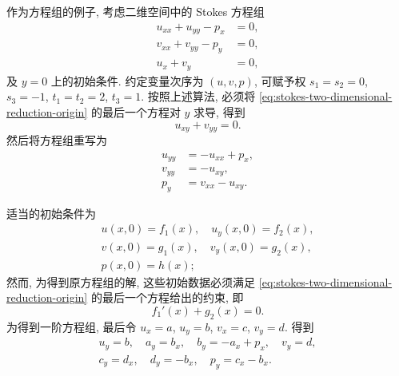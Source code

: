 \begin{Example}\label{ex:stokes-general-reduction}作为方程组的例子, 考虑二维空间中的 Stokes 方程组
\begin{equation}\label{eq:stokes-two-dimensional-reduction-origin}
\begin{aligned}
u_{xx}+u_{yy}-p_x&=0,\\v_{xx}+v_{yy}-p_y&=0,\\u_x+v_y&=0,
\end{aligned}
\end{equation}
及 $y=0$ 上的初始条件. 约定变量次序为 $(u,v,p)$, 可赋予权 $s_1=s_2=0$, $s_3=-1$, $t_1=t_2=2$, $t_3=1$. 按照上述算法, 必须将 \eqref{eq:stokes-two-dimensional-reduction-origin} 的最后一个方程对 $y$ 求导, 得到
\begin{equation}\label{eq:stokes-differentiated-divergence}
u_{xy}+v_{yy}=0.
\end{equation}
然后将方程组重写为
\begin{equation}\label{eq:stokes-normal-solved-system}
\begin{aligned}
u_{yy}&=-u_{xx}+p_x,\\v_{yy}&=-u_{xy},\\p_y&=v_{xx}-u_{xy}.
\end{aligned}
\end{equation}


适当的初始条件为
\begin{equation}\label{eq:stokes-reduction-initial-data}
\begin{gathered}
u(x,0)=f_1(x),\quad u_y(x,0)=f_2(x),\\
v(x,0)=g_1(x),\quad v_y(x,0)=g_2(x),\\
p(x,0)=h(x);
\end{gathered}
\end{equation}
然而, 为得到原方程组的解, 这些初始数据必须满足 \eqref{eq:stokes-two-dimensional-reduction-origin} 的最后一个方程给出的约束, 即
\begin{equation}\label{eq:stokes-reduction-initial-constraint}
f_1'(x)+g_2(x)=0.
\end{equation}
为得到一阶方程组, 最后令 $u_x=a$, $u_y=b$, $v_x=c$, $v_y=d$. 得到
\begin{equation}\label{eq:stokes-first-order-reduction}
\begin{gathered}
u_y=b,\quad a_y=b_x,\quad b_y=-a_x+p_x,\quad v_y=d,\\
c_y=d_x,\quad d_y=-b_x,\quad p_y=c_x-b_x.
\end{gathered}
\end{equation}
\end{Example}
